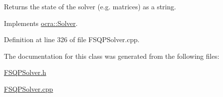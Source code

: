 Returns the state of the solver (e.\+g. matrices) as a string. 

Implements \hyperlink{classocra_1_1Solver_ab3783d1c208500bfb1daa3e1abf34146}{ocra\+::\+Solver}.



Definition at line 326 of file F\+S\+Q\+P\+Solver.\+cpp.



The documentation for this class was generated from the following files\+:\begin{DoxyCompactItemize}
\item 
\hyperlink{FSQPSolver_8h}{F\+S\+Q\+P\+Solver.\+h}\item 
\hyperlink{FSQPSolver_8cpp}{F\+S\+Q\+P\+Solver.\+cpp}\end{DoxyCompactItemize}
